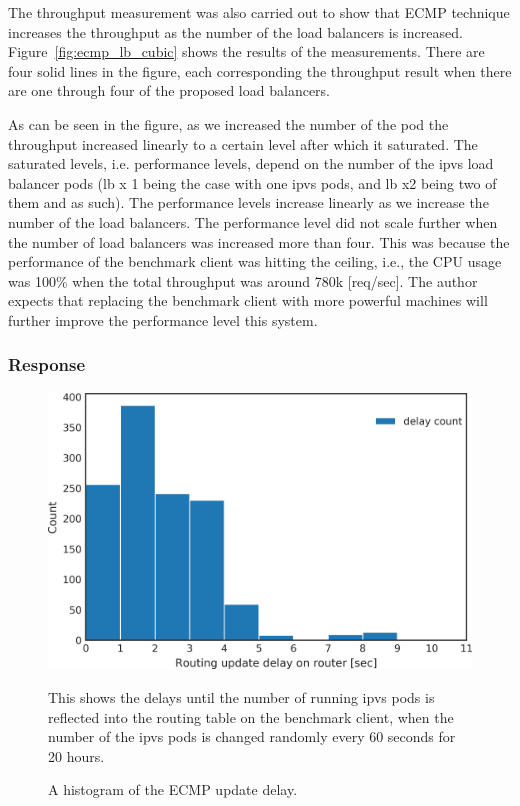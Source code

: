 The throughput measurement was also carried out to show that ECMP technique increases the throughput as the number of the load balancers is increased.
Figure~\ref{fig:ecmp_lb_cubic} shows the results of the measurements.
There are four solid lines in the figure, each corresponding the throughput result when there are one through four of the proposed load balancers.

As can be seen in the figure, as we increased the number of the pod the throughput increased linearly to a certain level after which it saturated.
The saturated levels, i.e. performance levels, depend on the number of the ipvs load balancer pods (lb x 1 being the case with one ipvs pods, and lb x2 being two of them and as such).
The performance levels increase linearly as we increase the number of the load balancers.
The performance level did not scale further when the number of load balancers was increased more than four.
This was because the performance of the benchmark client was hitting the ceiling, i.e., the CPU usage was 100\% when the total throughput was around 780k [req/sec].
The author expects that replacing the benchmark client with more powerful machines will further improve the performance level this system.

\FloatBarrier

\subsubsection{Response}

\begin{figure}[t]
  \includegraphics[width=0.9\columnwidth,left]{Figs/ecmp_delay_histgram}
  \caption{A histogram of the ECMP update delay.}
This shows the delays until the number of running ipvs pods is reflected into the routing table on the benchmark client,
when the number of the ipvs pods is changed randomly every 60 seconds for 20 hours.
  \label{fig:ecmp_delay_histgram}
\end{figure}

